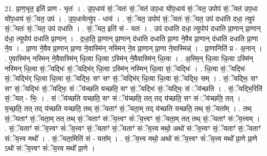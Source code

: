 \documentclass[17pt]{extarticle}
\begin{document}
21. प्रा॒ण॒भृत॒ इति॑ प्राण - भृतः॑ । . उ॒प॒धाय॑ सं॒ॅयतः॑ सं॒ॅयत॑ उप॒धा यो॑प॒धाय॑ सं॒ॅयत॒ उपोप॑ सं॒ॅयत॑ उप॒धा यो॑प॒धाय॑ सं॒ॅयत॒ उप॑ । . उ॒प॒धायेत्यु॑प - धाय॑ । . सं॒ॅयत॒ उपोप॑ सं॒ॅयतः॑ सं॒ॅयत॒ उप॑ दधाति दधा॒ त्युप॑ सं॒ॅयतः॑ सं॒ॅयत॒ उप॑ दधाति । . सं॒ॅयत॒ इति॑ सं - यतः॑ । . उप॑ दधाति दधा॒ त्युपोप॑ दधाति प्रा॒णान् प्रा॒णान् द॑धा॒ त्युपोप॑ दधाति प्रा॒णान् । . द॒धा॒ति॒ प्रा॒णान् प्रा॒णान् द॑धाति दधाति प्रा॒णा ने॒वैव प्रा॒णान् द॑धाति दधाति प्रा॒णा ने॒व । . प्रा॒णा ने॒वैव प्रा॒णान् प्रा॒णा ने॒वास्मि॑न् नस्मिन् ने॒व प्रा॒णान् प्रा॒णा ने॒वास्मिन्न्॑ । . प्रा॒णानिति॑ प्र - अ॒नान् । . ए॒वास्मि॑न् नस्मिन् ने॒वैवास्मि॑न् धि॒त्वा धि॒त्वा ऽस्मि॑न् ने॒वैवास्मि॑न् धि॒त्वा । . अ॒स्मि॒न् धि॒त्वा धि॒त्वा ऽस्मि॑न् नस्मिन् धि॒त्वा सं॒ॅयद्भिः॑ सं॒ॅयद्भि॑र् धि॒त्वा ऽस्मि॑न् नस्मिन् धि॒त्वा सं॒ॅयद्भिः॑ । . धि॒त्वा सं॒ॅयद्भिः॑ सं॒ॅयद्भि॑र् धि॒त्वा धि॒त्वा सं॒ॅयद्भिः॒ सꣳ सꣳ सं॒ॅयद्भि॑र् धि॒त्वा धि॒त्वा सं॒ॅयद्भिः॒ सम् । . सं॒ॅयद्भिः॒ सꣳ सꣳ सं॒ॅयद्भिः॑ सं॒ॅयद्भिः॒ सं ॅय॑च्छति यच्छति॒ सꣳ सं॒ॅयद्भिः॑ सं॒ॅयद्भिः॒ सं ॅय॑च्छति । . सं॒ॅयद्भि॒रिति॑ सं॒ॅयत् - भिः॒ । . सं ॅय॑च्छति यच्छति॒ सꣳ सं ॅय॑च्छति॒ तत् तद् य॑च्छति॒ सꣳ सं ॅय॑च्छति॒ तत् । . य॒च्छ॒ति॒ तत् तद् य॑च्छति यच्छति॒ तथ् सं॒ॅयताꣳ॑ सं॒ॅयता॒म् तद् य॑च्छति यच्छति॒ तथ् सं॒ॅयता᳚म् । . तथ् सं॒ॅयताꣳ॑ सं॒ॅयता॒म् तत् तथ् सं॒ॅयताꣳ॑ संॅय॒त्त्वꣳ सं॑ॅय॒त्त्वꣳ सं॒ॅयता॒म् तत् तथ् सं॒ॅयताꣳ॑ संॅय॒त्त्वम् । . सं॒ॅयताꣳ॑ संॅय॒त्त्वꣳ सं॑ॅय॒त्त्वꣳ सं॒ॅयताꣳ॑ सं॒ॅयताꣳ॑ संॅय॒त्त्व मथो॒ अथो॑ संॅय॒त्त्वꣳ सं॒ॅयताꣳ॑ सं॒ॅयताꣳ॑ संॅय॒त्त्व मथो᳚ । . सं॒ॅयता॒मिति॑ सं - यता᳚म् । . सं॒ॅय॒त्त्व मथो॒ अथो॑ संॅय॒त्त्वꣳ सं॑ॅय॒त्त्व मथो᳚ प्रा॒णे प्रा॒णे ऽथो॑ संॅय॒त्त्वꣳ सं॑ॅय॒त्त्व मथो᳚ प्रा॒णे । \newline
\end{document}
